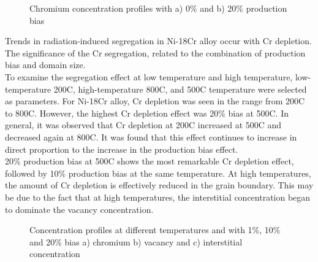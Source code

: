 \documentclass[a4paper]{article}
\begin{document}
    \begin{figure}[h!]  %
        \centering
        \caption{Chromium concentration profiles with a) 0\% and b) 20\% production bias }
        \label{figure:RIS_Cr_concentration}
    \end{figure}


        Trends in radiation-induced segregation in Ni-18Cr alloy occur with Cr depletion. The significance of the Cr segregation, related to the combination of production bias and domain size.\\

        To examine the segregation effect at low temperature and high temperature, low-temperature 200\degree C, high-temperature 800\degree C, and 500\degree C temperature were selected as parameters. For Ni-18Cr alloy, Cr depletion was seen in the range from 200\degree C to 800\degree C. However, the highest Cr depletion effect was 20\% bias at 500\degree C. In general, it was observed that Cr depletion at 200\degree C increased at 500\degree C and decreased again at 800\degree C. It was found that this effect continues to increase in direct proportion to the increase in the production bias effect.\\

        20\% production bias at 500\degree C shows the most remarkable Cr depletion effect, followed by 10\%  production bias at the same temperature. At high temperatures, the amount of Cr depletion is effectively reduced in the grain boundary. This may be due to the fact that at high temperatures, the interstitial concentration began to dominate the vacancy concentration.

    \begin{figure}[h!]  %
        \centering
        \caption{Concentration profiles at different temperatures and with 1\%, 10\% and 20\% bias a) chromium b) vacancy and c) interstitial concentration}
        \label{figure:RIS_temperature}
    \end{figure}



\clearpage
\end{document}

